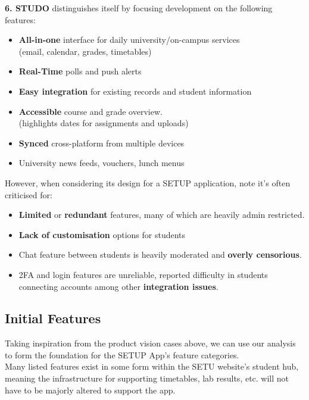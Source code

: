\textbf{6. STUDO} distinguishes itself by focusing development on the following features:\\
\begin{itemize}
    \vspace{-0.5\baselineskip}
  \item \textbf{All-in-one} interface for daily university/on-campus services \\(email, calendar, grades, timetables)
  \item \textbf{Real-Time} polls and push alerts
  \item \textbf{Easy integration} for existing records and student information
  \item \textbf{Accessible} course and grade overview. \\ (highlights dates for assignments and uploads)
  \item \textbf{Synced} cross-platform from multiple devices
  \item University news feeds, vouchers, lunch menus \\
\end{itemize}

However, when considering its design for a SETUP application, note it's often criticised for: 
\begin{itemize}
  \item \textbf{Limited} or \textbf{redundant} features, many of which are heavily admin restricted.
  \item \textbf{Lack of customisation} options for students
  \item Chat feature between students is heavily moderated and \textbf{overly censorious}. 
  \item 2FA and login features are unreliable, reported difficulty in students connecting accounts among other \textbf{integration issues}.
\end{itemize}

\subsection*{Initial Features}


Taking inspiration from the product vision cases above, we can use our analysis to form the foundation for the SETUP App's feature categories. \\

Many listed features exist in some form within the SETU website's student hub, meaning the infrastructure for supporting timetables, lab results, etc. will not have to be majorly altered to support the app.\\

